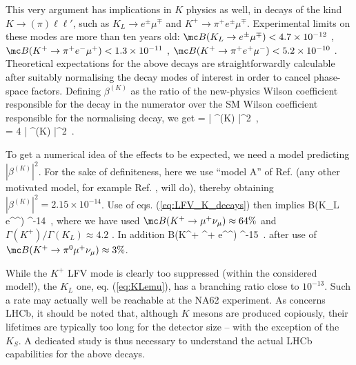 This very argument has implications in $K$ physics as well, in decays of the kind $K \to (\pi) \ell \ell'$, such as $K_L \to e^\pm \mu^\mp$ and $K^+ \to \pi^+ e^\pm \mu^\mp$. Experimental limits on these modes are more than ten years old: $\mc B(K_L \to e^\pm \mu^\mp) < 4.7 \times 10^{-12}$ \cite{Ambrose:1998us}, $\mc B(K^+ \to \pi^+ e^- \mu^+) < 1.3 \times 10^{-11}$ \cite{Sher:2005sp}, $\mc B(K^+ \to \pi^+ e^+ \mu^-) < 5.2 \times 10^{-10}$ \cite{Appel:2000tc}. Theoretical expectations for the above decays are straightforwardly calculable after suitably normalising the decay modes of interest in order to cancel phase-space factors. Defining $\beta^{(K)}$ as the ratio of the new-physics Wilson coefficient responsible for the decay in the numerator over the SM Wilson coefficient responsible for the normalising decay, we get
\bea
\label{eq:LFV_K_decays}
 = | \beta^{(K)} |^2~, \\
\label{eq:LFV_K_decays_2}
 = 4 | \beta^{(K)} |^2~.
\eea

To get a numerical idea of the effects to be expected, we need a model predicting $|\beta^{(K)}|^2$. For the sake of definiteness, here we use ``model A'' of Ref. \cite{Guadagnoli:2015nra} (any other motivated model, for example Ref. \cite{Boucenna:2015raa}, will do), thereby obtaining $| \beta^{(K)} |^2 = 2.15 \times 10^{-14}$. Use of eqs. (\ref{eq:LFV_K_decays}) then implies
\be
\label{eq:KLemu}
\mc B(K_L \to e^\pm \mu^\mp)  ^{-14}~,
\ee
where we have used $\mc B(K^+ \to \mu^+ \nu_\mu) \approx 64\%$ and $\Gamma(K^+) / \Gamma(K_L) \approx 4.2$ \cite{Agashe:2014kda}. In addition
\be
\mc B(K^+ \to \pi^+ e^\pm \mu^\mp)  ^{-15}~.
\ee
after use of $\mc B(K^+ \to \pi^0 \mu^+ \nu_\mu) \approx 3\%$.

While the $K^+$ LFV mode is clearly too suppressed (within the considered model!), the $K_L$ one, eq. (\ref{eq:KLemu}), has a branching ratio close to $10^{-13}$. Such a rate may actually well be reachable at the NA62 experiment. As concerns LHCb, it should be noted that, although $K$ mesons are produced copiously, their lifetimes are typically too long for the detector size -- with the exception of the $K_S$. A dedicated study is thus necessary to understand the actual LHCb capabilities for the above decays.





%
